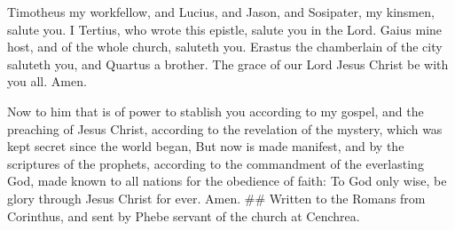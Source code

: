  Timotheus my workfellow, and Lucius, and Jason, and
Sosipater, my kinsmen, salute you.  I Tertius, who wrote
this epistle, salute you in the Lord.  Gaius mine host, and
of the whole church, saluteth you. Erastus the chamberlain of the city
saluteth you, and Quartus a brother.  The grace of our Lord
Jesus Christ be with you all. Amen.

 Now to him that is of power to stablish you according to
my gospel, and the preaching of Jesus Christ, according to the
revelation of the mystery, which was kept secret since the world began,
 But now is made manifest, and by the scriptures of the
prophets, according to the commandment of the everlasting God, made
known to all nations for the obedience of faith:  To God
only wise, be glory through Jesus Christ for ever. Amen. \#\# Written to
the Romans from Corinthus, and sent by Phebe servant of the church at
Cenchrea.
